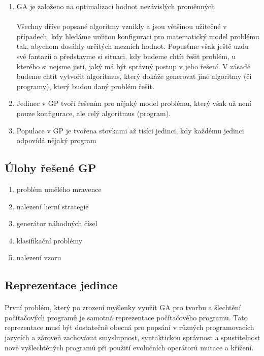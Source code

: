 \documentclass[bc,male,java,dept460]{diploma}		%
\begin{document}
\begin{enumerate}
\item GA je založeno na optimalizaci hodnot nezávislých proměnných
\paragraph*{}
Všechny dříve popsané algoritmy vznikly a jsou většinou užitečné v případech, kdy hledáme určitou konfiguraci pro matematický model problému tak, abychom dosáhly určitých mezních hodnot. Popusťme však ještě uzdu své fantazii a představme si situaci, kdy budeme chtít řešit problém, u kterého si nejsme jistí, jaký má být správný postup v jeho řešení. V zásadě budeme chtít vytvořit algoritmus, který dokáže generovat jiné algoritmy (či programy), který budou daný problém řešit.

\item Jedinec v GP tvoří řešením pro nějaký model problému, který však už není pouze konfigurace, ale celý algoritmus (program).

\item Populace v GP je tvořena stovkami až tisíci jedinci, kdy každému jedinci odpovídá nějaký program
\end{enumerate}

\subsection{Úlohy řešené GP}
\begin{enumerate}
\item problém umělého mravence
\item nalezení herní strategie
\item generátor náhodných čísel
\item klasifikační problémy
\item nalezení vzoru
\end{enumerate}

\subsection{Reprezentace jedince}
\paragraph*{}
První problém, který po zrození myšlenky využít GA pro tvorbu a šlechtění počítačových programů je samotná reprezentace počítačového programu. Tato reprezentace musí být dostatečně obecná pro popsání v různých programovacích jazycích a zároveň zachovávat smyslupnost, syntaktickou správnost a spustitelnost nově vyšlechtěných programů při použití evolučních operátorů mutace a křížení.
\end{document}
